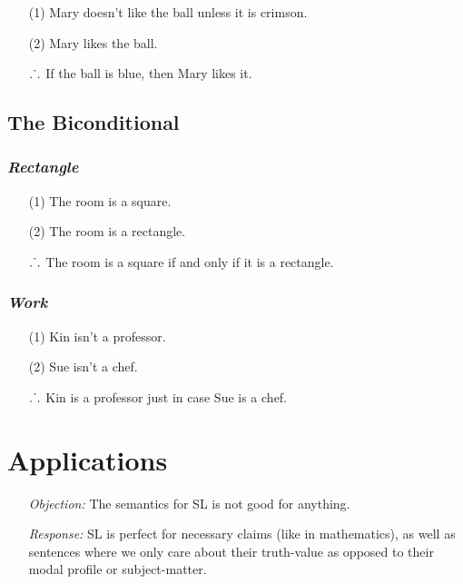 \documentclass[a4paper, 11pt]{article} %
\def\therefore{\ensuremath{\ldotp\dot{}\,\ldotp}}
\begin{document}
\begin{enumerate}
  \item[(1)] Mary doesn't like the ball unless it is crimson.
  \item[(2)] Mary likes the ball.
  \item[\therefore] If the ball is blue, then Mary likes it.
\end{enumerate}






\subsection*{\sc The Biconditional}

\subsubsection*{\it \textbf{Rectangle}}

\begin{enumerate}
  \item[(1)] The room is a square.
  \item[(2)] The room is a rectangle.
  \item[\therefore] The room is a square if and only if it is a rectangle.
\end{enumerate}





\subsubsection*{\it \textbf{Work}}

\begin{enumerate}
  \item[(1)] Kin isn't a professor.
  \item[(2)] Sue isn't a chef.
  \item[\therefore] Kin is a professor just in case Sue is a chef.
\end{enumerate}




\section*{Applications}

\begin{enumerate}[leftmargin=1.5in,labelsep=.15in] %
  \item[\it Objection:] The semantics for SL is not good for anything.
  \item[\it Response:] SL is perfect for necessary claims (like in mathematics), as well as sentences where we only care about their truth-value as opposed to their modal profile or subject-matter.
\end{enumerate}
\end{document}
